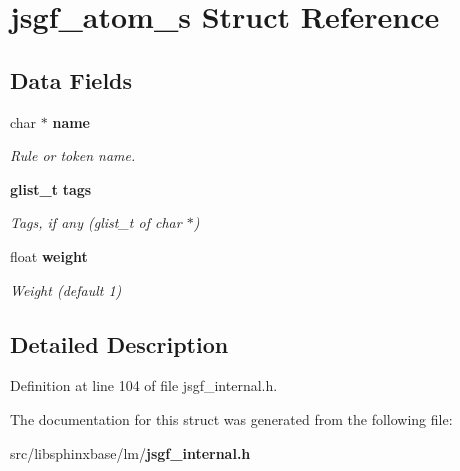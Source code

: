\section{jsgf\-\_\-atom\-\_\-s Struct Reference}
\label{structjsgf__atom__s}
\subsection*{Data Fields}
\begin{DoxyCompactItemize}
\item 
char $\ast$ {\bf name}\label{structjsgf__atom__s_ac7473e48f49258c5e5ef65bbb669b19e}

\begin{DoxyCompactList}\small\item\em Rule or token name. \end{DoxyCompactList}\item 
{\bf glist\-\_\-t} {\bf tags}\label{structjsgf__atom__s_a4ecab128d84fd748efe52e338e7e2ecb}

\begin{DoxyCompactList}\small\item\em Tags, if any (glist\-\_\-t of char $\ast$) \end{DoxyCompactList}\item 
float {\bf weight}\label{structjsgf__atom__s_a50672ba6d1e24c55bf8b58b97114effa}

\begin{DoxyCompactList}\small\item\em Weight (default 1) \end{DoxyCompactList}\end{DoxyCompactItemize}


\subsection{Detailed Description}


Definition at line 104 of file jsgf\-\_\-internal.\-h.



The documentation for this struct was generated from the following file\-:\begin{DoxyCompactItemize}
\item 
src/libsphinxbase/lm/{\bf jsgf\-\_\-internal.\-h}\end{DoxyCompactItemize}

